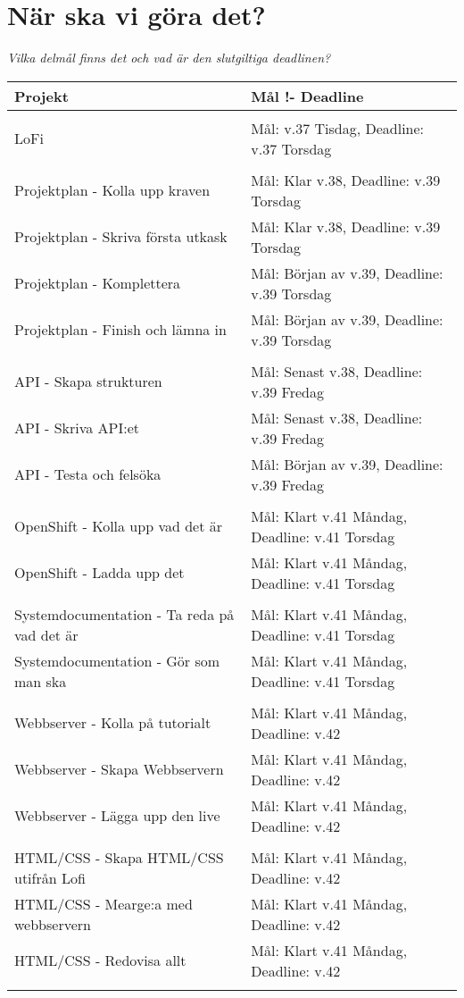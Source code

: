 \documentclass{TDP003mall}
\begin{document}
\newpage





\section{När ska vi göra det?}
\textit{Vilka delmål finns det och vad är den slutgiltiga deadlinen?}

\begin{table}[!h]
\begin{tabularx}{\linewidth}{|l|X|}

\hline
Projekt & Mål !- Deadline \\\hline 
\\
LoFi & Mål: v.37 Tisdag, Deadline: v.37 Torsdag \\
\\
Projektplan - Kolla upp kraven & Mål: Klar v.38, Deadline: v.39 Torsdag \\
Projektplan - Skriva första utkask & Mål: Klar v.38, Deadline: v.39 Torsdag \\
Projektplan - Komplettera & Mål: Början av v.39, Deadline: v.39 Torsdag \\
Projektplan - Finish och lämna in & Mål: Början av v.39, Deadline: v.39 Torsdag \\
\\
API - Skapa strukturen & Mål: Senast v.38, Deadline: v.39 Fredag \\
API - Skriva API:et & Mål: Senast v.38, Deadline: v.39 Fredag \\
API - Testa och felsöka & Mål: Början av v.39, Deadline: v.39 Fredag \\
\\
OpenShift - Kolla upp vad det är & Mål: Klart v.41 Måndag, Deadline: v.41 Torsdag \\
OpenShift - Ladda upp det & Mål: Klart v.41 Måndag, Deadline: v.41 Torsdag \\
\\
Systemdocumentation - Ta reda på vad det är & Mål: Klart v.41 Måndag, Deadline: v.41 Torsdag \\
Systemdocumentation - Gör som man ska & Mål: Klart v.41 Måndag, Deadline: v.41 Torsdag \\
\\
Webbserver - Kolla på tutorialt & Mål: Klart v.41 Måndag, Deadline: v.42 \\
Webbserver - Skapa Webbservern & Mål: Klart v.41 Måndag, Deadline: v.42 \\
Webbserver - Lägga upp den live & Mål: Klart v.41 Måndag, Deadline: v.42 \\
\\
HTML/CSS - Skapa HTML/CSS utifrån Lofi & Mål: Klart v.41 Måndag, Deadline: v.42 \\
HTML/CSS - Mearge:a med webbservern & Mål: Klart v.41 Måndag, Deadline: v.42 \\
HTML/CSS - Redovisa allt & Mål: Klart v.41 Måndag, Deadline: v.42 \\
\\
\hline 

\end{tabularx}
\end{table}
\end{document}
